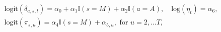 \begin{equation}
  \begin{gathered}
    \text{logit}(\delta_{a, s, t}) = \alpha_{0} + \alpha_{1}\mathbb{I}(s = M) + \alpha_{2}\mathbb{I}(a = A), \quad
    \text{log}(\eta_{t}) = \alpha_{6}, \\
    \text{logit}(\pi_{s, u}) = \alpha_{4} \mathbb{I}(s = M) + \alpha_{5, u}, \,\, \text{for} \,\, u = 2, \ldots T,
  \end{gathered}
  \label{eqn:parameterisation-info}
\end{equation}